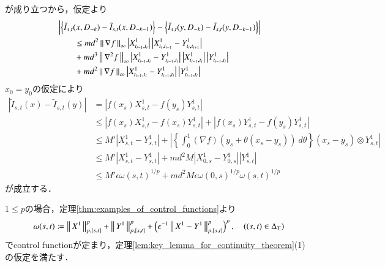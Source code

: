 \begin{prf}
\begin{description}
				が成り立つから，仮定より
				\begin{align}
					&\left| \left\{ \tilde{I}_{s,t}(x,D_{-k}) - \tilde{I}_{s,t}(x,D_{-k-1}) \right\}
					- \left\{ \tilde{I}_{s,t}(y,D_{-k}) - \tilde{I}_{s,t}(y,D_{-k-1}) \right\} \right| \\
					&\qquad \leq m d^2 \left\|\, \nabla f\, \right\|_{\infty} \left| X^1_{t_{i-1},t_i} \right|\left| X^1_{t_i,t_{i+1}} - Y^1_{t_i,t_{i+1}} \right| \\
						&\qquad + m d^3 \left\|\, \nabla^2 f\, \right\|_{\infty} \left| X^1_{t_{i-1},t_i} - Y^1_{t_{i-1},t_i} \right|\left| X^1_{t_{i-1},t_i} \right| \left| Y^1_{t_{i-1},t_i} \right| \\
						&\qquad + m d^2 \left\|\, \nabla f\, \right\|_{\infty}  \left| X^1_{t_{i-1},t_i} - Y^1_{t_{i-1},t_i} \right|\left| Y^1_{t_{i-1},t_i} \right|
				\end{align}
				$x_0 = y_0$の仮定により
				\begin{align}
					\left| \tilde{I}_{s,t}(x) - \tilde{I}_{s,t}(y) \right|
					&= \left| f(x_s)X^1_{s,t} - f(y_s)Y^1_{s,t} \right| \\
					&\leq \left| f(x_s)X^1_{s,t} - f(x_s)Y^1_{s,t} \right|
						+ \left| f(x_s)Y^1_{s,t} - f(y_s)Y^1_{s,t} \right| \\
					&\leq M' \left| X^1_{s,t} - Y^1_{s,t} \right|
						+ \left| \left\{ \int_0^1 (\nabla f)(y_s + \theta(x_s - y_s))\ d\theta \right\}
						(x_s - y_s) \otimes Y^1_{s,t} \right| \\
					&\leq M' \left| X^1_{s,t} - Y^1_{s,t} \right|
						+ m d^2 M \left| X^1_{0,s} - Y^1_{0,s}\right| \left| Y^1_{s,t} \right| \\
					&\leq M' \epsilon \omega(s,t)^{1/p} + m d^2 M \epsilon \omega(0,s)^{1/p} \omega(s,t)^{1/p} 
				\end{align}
				が成立する．
		\end{description}
	\end{prf}
	
	\begin{prf}
		$1 \leq p$の場合，定理\ref{thm:examples_of_control_functions}より
		\begin{align}
			\omega(s,t) \coloneqq \left\|\, X^1\, \right\|_{p,[s,t]}^p + \left\|\, Y^1\, \right\|_{p,[s,t]}^p + \left( \epsilon^{-1} \left\|\, X^1 - Y^1\, \right\|_{p,[s,t]}^p \right)^p,
			\quad ((s,t) \in \Delta_T)
		\end{align}
		でcontrol functionが定まり，定理\ref{lem:key_lemma_for_continuity_theorem}(1)の仮定を満たす．
		\QED
	\end{prf}